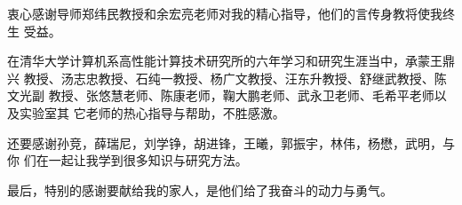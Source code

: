 

\begin{ack}

  衷心感谢导师郑纬民教授和余宏亮老师对我的精心指导，他们的言传身教将使我终生
  受益。

  在清华大学计算机系高性能计算技术研究所的六年学习和研究生涯当中，承蒙王鼎兴
  教授、汤志忠教授、石纯一教授、杨广文教授、汪东升教授、舒继武教授、陈文光副
  教授、张悠慧老师、陈康老师，鞠大鹏老师、武永卫老师、毛希平老师以及实验室其
  它老师的热心指导与帮助，不胜感激。

  还要感谢孙竞，薛瑞尼，刘学铮，胡进锋，王曦，郭振宇，林伟，杨懋，武明，与你
  们在一起让我学到很多知识与研究方法。

  最后，特别的感谢要献给我的家人，是他们给了我奋斗的动力与勇气。

\end{ack}
